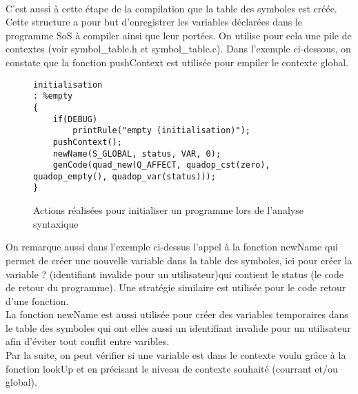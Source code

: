 \paragraph{}
C'est aussi à cette étape de la compilation que la table des symboles est créée. Cette structure a pour but d'enregistrer les variables déclarées dans le programme SoS à compiler ainsi que leur portées. On utilise pour cela une pile de contextes (voir \textsf{symbol\_table.h} et \textsf{symbol\_table.c}). Dans l'exemple ci-dessous, on constate que la fonction \textsf{pushContext} est utilisée pour empiler le contexte global.
\begin{figure}[H]
\begin{lstlisting}
initialisation 
: %empty
{
    if(DEBUG)
        printRule("empty (initialisation)");
    pushContext();
    newName(S_GLOBAL, status, VAR, 0);
    genCode(quad_new(Q_AFFECT, quadop_cst(zero), quadop_empty(), quadop_var(status)));
}
\end{lstlisting}
\caption{Actions réalisées pour initialiser un programme lors de l'analyse syntaxique}
\end{figure}
On remarque aussi dans l'exemple ci-dessus l'appel à la fonction \textsf{newName} qui permet de créer une nouvelle variable dans la table des symboles, ici pour créer la variable \textsf{?} (identifiant invalide pour un utilisateur)qui contient le status (le code de retour du programme). Une stratégie similaire est utilisée pour le code retour d'une fonction.\\
La fonction \textsf{newName} est aussi utilisée pour créer des variables temporaires dans le table des symboles qui ont elles aussi un identifiant invalide pour un utilisateur afin d'éviter tout conflit entre varibles.\\
Par la suite, on peut vérifier si une variable est dans le contexte voulu grâce à la fonction \textsf{lookUp} et en précisant le niveau de contexte souhaité (courrant et/ou global).